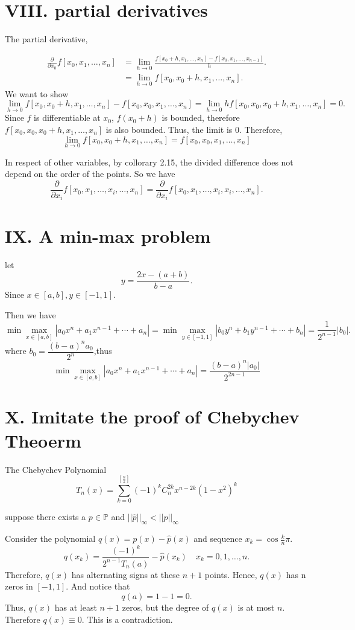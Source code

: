 \documentclass[a4paper]{article}
\begin{document}
\section*{VIII. partial derivatives}
The partial derivative,

\begin{align*}
    \frac{\partial}{\partial x_0} f[x_0,x_1,\dots,x_n] &= \lim_{h\to 0}\frac{f[x_0 + h,x_1,\dots,x_n] - f[x_0,x_1,\dots,x_{n-1}]}{h}.
    \\&= \lim_{h\to 0}f[x_0,x_0+h,x_1,\dots,x_n].
\end{align*}
We want to show \[
    \lim_{h\to 0}f[x_0,x_0+h,x_1,\dots,x_n] - f[x_0,x_0,x_1,\dots,x_n] = \lim_{h\to 0}h f[x_0,x_0,x_0+h,x_1,\dots,x_n]= 0.
\]
Since $f$ is differentiable at $x_0$, $f(x_0+h)$ is bounded, therefore $f[x_0,x_0,x_0+h,x_1,\dots,x_n]$ is also bounded. Thus, the limit is 0. Therefore, \[
    \lim_{h\to 0}f[x_0,x_0+h,x_1,\dots,x_n] = f[x_0,x_0,x_1,\dots,x_n]
\]

In respect of other variables, by collorary 2.15, the divided difference does not depend on the order of the points. So we have\[
\frac{\partial}{\partial x_i} f[x_0,x_1,\dots,x_i,\dots,x_n] = \frac{\partial}{\partial x_i} f[x_0,x_1,\dots,x_i,x_i,\dots,x_n]. 
\]

\section*{IX. A min-max problem}
let $$y = \frac{2x-(a+b)}{b-a}.$$ Since $x \in [a,b], y \in [-1,1]$.

Then we have \[
\min \max_{x \in [a,b]} |a_0x^n+a_1x^{n-1}+\cdots+a_n| = \min \max_{y \in [-1,1]} |b_0y^n+b_1y^{n-1}+\cdots+b_n| = \frac{1}{2^{n-1}}|b_0|.
\]
where $b_0 = \dfrac{(b-a)^na_0}{2^n}$,thus\[
\min \max_{x \in [a,b]} |a_0x^n+a_1x^{n-1}+\cdots+a_n| = \frac{(b-a)^n|a_0|}{2^{2n-1}}\]

\section*{X. Imitate the proof of Chebychev Theoerm}
The Chebychev Polynomial \[T_n(x) = \sum_{k=0}^{[\frac{n}{2}]}(-1)^kC_n^{2k}x^{n-2k}(1-x^2)^k\]

suppose there exists a $p \in \mathbb{P}$ and $||\hat{p}||_\infty< ||p||_\infty$

Consider the polynomial $q(x) = p(x) - \hat{p}(x)$ and sequence $x_k = \cos \frac{k}{n} \pi .$ 
\[
q(x_k) = \frac{(-1)^k}{2^{n-1}T_n(a)} - \hat{p}(x_k) \quad x_k = 0,1,\dots,n.
\]
Therefore, $q(x)$ has alternating signs at these $n + 1$ points. Hence, $q(x)$ has n zeros in $[-1,1]$. And notice that\[
q(a) = 1-1 = 0.\] Thus, $q(x)$ has at least $n+1$ zeros, but the degree of $q(x)$ is at most $n$. Therefore $q(x)\equiv 0$. This is a contradiction. 
\end{document}
